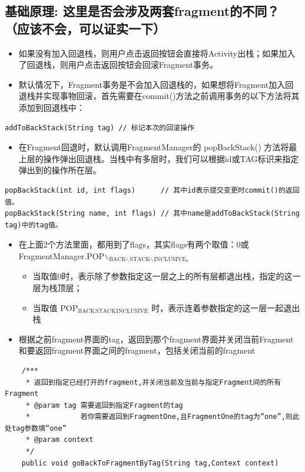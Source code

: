 \documentclass[9pt, b5paaper]{book}
\begin{document}
\subsection{基础原理: 这里是否会涉及两套fragment的不同？（应该不会，可以证实一下）}
\label{sec-2-9-2}
\begin{itemize}
\item 如果没有加入回退栈，则用户点击返回按钮会直接将Activity出栈；如果加入了回退栈，则用户点击返回按钮会回滚Fragment事务。
\item 默认情况下，Fragment事务是不会加入回退栈的，如果想将Fragment加入回退栈并实现事物回滚，首先需要在commit()方法之前调用事务的以下方法将其添加到回退栈中：
\end{itemize}
\begin{verbatim}
addToBackStack(String tag) // 标记本次的回滚操作
\end{verbatim}
\begin{itemize}
\item 在Fragment回退时，默认调用FragmentManager的 popBackStack() 方法将最上层的操作弹出回退栈。当栈中有多层时，我们可以根据id或TAG标识来指定弹出到的操作所在层。
\end{itemize}
\begin{verbatim}
popBackStack(int id, int flags)      // 其中id表示提交变更时commit()的返回值。
popBackStack(String name, int flags) // 其中name是addToBackStack(String tag)中的tag值。
\end{verbatim}
\begin{itemize}
\item 在上面2个方法里面，都用到了flags，其实flags有两个取值：0或FragmentManager.POP$\backslash$$_{\text{BACK$\backslash$}}$$_{\text{STACK$\backslash$}}$$_{\text{INCLUSIVE。}}$
\begin{itemize}
\item 当取值0时，表示除了参数指定这一层之上的所有层都退出栈，指定的这一层为栈顶层；
\item 当取值 POP$_{\text{BACK}}$$_{\text{STACK}}$$_{\text{INCLUSIVE}}$ 时，表示连着参数指定的这一层一起退出栈
\end{itemize}
\item 根据之前fragment界面的tag，返回到那个fragment界面并关闭当前Fragment和要返回fragment界面之间的fragment，包括关闭当前的fragment
\end{itemize}
\begin{verbatim}
    /***
     * 返回到指定已经打开的fragment,并关闭当前及当前与指定Fragment间的所有Fragment
     * @param tag 需要返回到指定Fragment的tag
     *            若你需要返回到FragmentOne,且FragmentOne的tag为“one”,则此处tag参数填“one”
     * @param context
     */
    public void goBackToFragmentByTag(String tag,Context context)
\end{verbatim}
\end{document}
